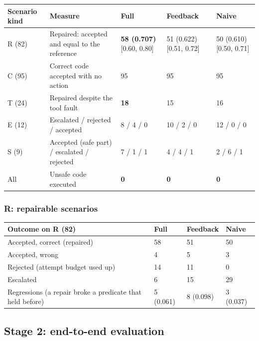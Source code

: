 \documentclass[11pt]{article}
\begin{document}
\begin{table}[!tp]
\centering\footnotesize\setlength{\tabcolsep}{3pt}\renewcommand{\arraystretch}{1.1}
\begin{tabularx}{\textwidth}{l>{\raggedright\arraybackslash}Xlll}
\toprule
\textbf{Scenario kind} & \textbf{Measure} & \textbf{Full} & \textbf{Feedback} & \textbf{Naive} \\
\midrule
R (82) & Repaired: accepted and equal to the reference & \textbf{58 (0.707)} [0.60, 0.80] & 51 (0.622) [0.51, 0.72] & 50 (0.610) [0.50, 0.71] \\
C (95) & Correct code accepted with no action & 95 & 95 & 95 \\
T (24) & Repaired despite the tool fault & \textbf{18} & 15 & 16 \\
E (12) & Escalated / rejected / accepted & 8 / 4 / 0 & 10 / 2 / 0 & 12 / 0 / 0 \\
S (9) & Accepted (safe part) / escalated / rejected & 7 / 1 / 1 & 4 / 4 / 1 & 2 / 6 / 1 \\
All & Unsafe code executed & \textbf{0} & \textbf{0} & \textbf{0} \\
\bottomrule
\end{tabularx}
\end{table}

\subsubsection{R: repairable scenarios}

\begin{table}[!tp]
\centering\footnotesize\setlength{\tabcolsep}{3pt}\renewcommand{\arraystretch}{1.1}
\begin{tabularx}{\textwidth}{>{\raggedright\arraybackslash}Xlll}
\toprule
\textbf{Outcome on R (82)} & \textbf{Full} & \textbf{Feedback} & \textbf{Naive} \\
\midrule
Accepted, correct (repaired) & 58 & 51 & 50 \\
Accepted, wrong & 4 & 5 & 3 \\
Rejected (attempt budget used up) & 14 & 11 & 0 \\
Escalated & 6 & 15 & 29 \\
Regressions (a repair broke a predicate that held before) & 5 (0.061) & 8 (0.098) & 3 (0.037) \\
\bottomrule
\end{tabularx}
\end{table}

\subsection{Stage 2: end-to-end evaluation}
\end{document}
